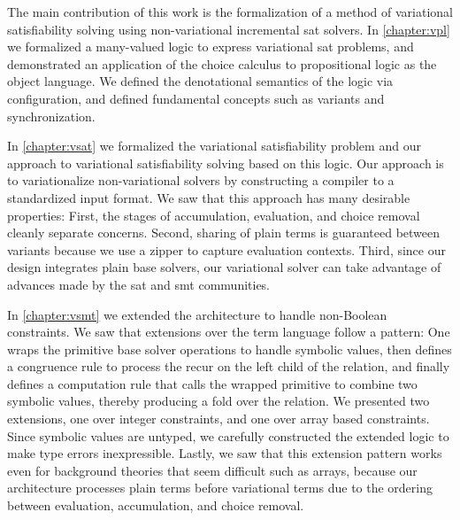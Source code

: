 \label{section:conclusion:cont-summary}

The main contribution of this work is the formalization of a method of
variational satisfiability solving using non-variational incremental \ac{sat}
solvers.
%
In \autoref{chapter:vpl} we formalized a many-valued logic to express
variational \ac{sat} problems, and demonstrated an application of the choice
calculus to propositional logic as the object language. We defined the
denotational semantics of the logic via configuration, and defined fundamental
concepts such as variants and synchronization.

In \autoref{chapter:vsat} we formalized the variational satisfiability problem
and our approach to variational satisfiability solving based on this logic. Our
approach is to variationalize non-variational solvers by constructing a compiler
to a standardized input format. We saw that this approach has many desirable
properties: First, the stages of accumulation, evaluation, and choice removal
cleanly separate concerns. Second, sharing of plain terms is guaranteed between
variants because we use a zipper to capture evaluation contexts. Third, since
our design integrates plain base solvers, our variational solver can take
advantage of advances made by the \ac{sat} and \ac{smt} communities.
%

In \autoref{chapter:vsmt} we extended the architecture to handle non-Boolean
constraints. We saw that extensions over the term language follow a pattern: One
wraps the primitive base solver operations to handle symbolic values, then
defines a congruence rule to process the recur on the left child of the
relation, and finally defines a computation rule that calls the wrapped
primitive to combine two symbolic values, thereby producing a fold over the
relation. We presented two extensions, one over integer constraints, and one
over array based constraints. Since symbolic values are untyped, we carefully
constructed the extended logic to make type errors inexpressible. Lastly, we saw
that this extension pattern works even for background theories that seem
difficult such as arrays, because our architecture processes plain terms before
variational terms due to the ordering between evaluation, accumulation, and
choice removal.

